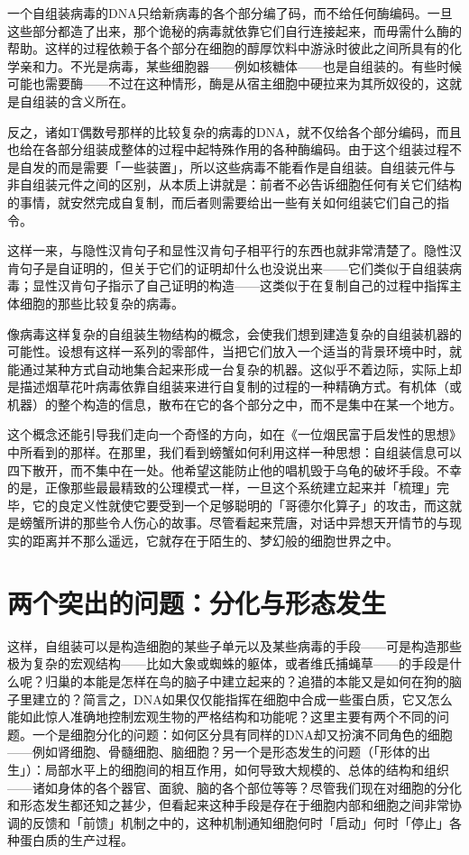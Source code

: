 \documentclass[
  12pt,
  twoside,
  openright,
  oldfontcommands,
]{memoir}
\begin{document}
一个自组装病毒的DNA只给新病毒的各个部分编了码，而不给任何酶编码。一旦这些部分都造了出来，那个诡秘的病毒就依靠它们自行连接起来，而毋需什么酶的帮助。这样的过程依赖于各个部分在细胞的醇厚饮料中游泳时彼此之间所具有的化学亲和力。不光是病毒，某些细胞器------例如核糖体------也是自组装的。有些时候可能也需要酶------不过在这种情形，酶是从宿主细胞中硬拉来为其所奴役的，这就是自组装的含义所在。

反之，诸如T偶数号那样的比较复杂的病毒的DNA，就不仅给各个部分编码，而且也给在各部分组装成整体的过程中起特殊作用的各种酶编码。由于这个组装过程不是自发的而是需要「一些装置」，所以这些病毒不能看作是自组装。自组装元件与非自组装元件之间的区别，从本质上讲就是：前者不必告诉细胞任何有关它们结构的事情，就安然完成自复制，而后者则需要给出一些有关如何组装它们自己的指令。

这样一来，与隐性汉肯句子和显性汉肯句子相平行的东西也就非常清楚了。隐性汉肯句子是自证明的，但关于它们的证明却什么也没说出来------它们类似于自组装病毒；显性汉肯句子指示了自己证明的构造------这类似于在复制自己的过程中指挥主体细胞的那些比较复杂的病毒。

像病毒这样复杂的自组装生物结构的概念，会使我们想到建造复杂的自组装机器的可能性。设想有这样一系列的零部件，当把它们放入一个适当的背景环境中时，就能通过某种方式自动地集合起来形成一台复杂的机器。这似乎不着边际，实际上却是描述烟草花叶病毒依靠自组装来进行自复制的过程的一种精确方式。有机体（或机器）的整个构造的信息，散布在它的各个部分之中，而不是集中在某一个地方。

这个概念还能引导我们走向一个奇怪的方向，如在《一位烟民富于启发性的思想》中所看到的那样。在那里，我们看到螃蟹如何利用这样一种思想：自组装信息可以四下散开，而不集中在一处。他希望这能防止他的唱机毁于乌龟的破坏手段。不幸的是，正像那些最最精致的公理模式一样，一旦这个系统建立起来并「梳理」完毕，它的良定义性就使它要受到一个足够聪明的「哥德尔化算子」的攻击，而这就是螃蟹所讲的那些令人伤心的故事。尽管看起来荒唐，对话中异想天开情节的与现实的距离并不那么遥远，它就存在于陌生的、梦幻般的细胞世界之中。

\section{两个突出的问题：分化与形态发生}

这样，自组装可以是构造细胞的某些子单元以及某些病毒的手段------可是构造那些极为复杂的宏观结构------比如大象或蜘蛛的躯体，或者维氏捕蝇草------的手段是什么呢？归巢的本能是怎样在鸟的脑子中建立起来的？追猎的本能又是如何在狗的脑子里建立的？简言之，DNA如果仅仅能指挥在细胞中合成一些蛋白质，它又怎么能如此惊人准确地控制宏观生物的严格结构和功能呢？这里主要有两个不同的问题。一个是细胞分化的问题：如何区分具有同样的DNA却又扮演不同角色的细胞------例如肾细胞、骨髓细胞、脑细胞？另一个是形态发生的问题（「形体的出生」）：局部水平上的细胞间的相互作用，如何导致大规模的、总体的结构和组织------诸如身体的各个器官、面貌、脑的各个部位等等？尽管我们现在对细胞的分化和形态发生都还知之甚少，但看起来这种手段是存在于细胞内部和细胞之间非常协调的反馈和「前馈」机制之中的，这种机制通知细胞何时「启动」何时「停止」各种蛋白质的生产过程。
\end{document}
